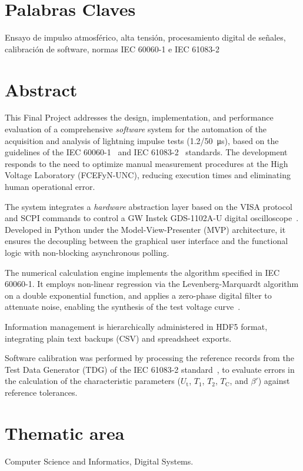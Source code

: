 \section*{Palabras Claves}
Ensayo de impulso atmosférico, alta tensión, procesamiento digital de señales, calibración de software, normas IEC 60060-1 e IEC 61083-2

\newpage
\section*{Abstract}
This Final Project addresses the design, implementation, and performance evaluation of a comprehensive \emph{software} system for the automation of the acquisition and analysis of lightning impulse tests (\qty[parse-numbers=false]{1.2/50}{\micro\second}), based on the guidelines of the IEC 60060-1~\cite{iec60060_1} and IEC 61083-2~\cite{iec61083_2} standards. The development responds to the need to optimize manual measurement procedures at the High Voltage Laboratory (FCEFyN-UNC), reducing execution times and eliminating human operational error.

The system integrates a \emph{hardware} abstraction layer based on the VISA protocol and SCPI commands to control a GW Instek GDS-1102A-U digital oscilloscope~\cite{gds1000au_ProgrammingManual}. Developed in Python under the Model-View-Presenter (MVP) architecture, it ensures the decoupling between the graphical user interface and the functional logic with non-blocking asynchronous polling.

The numerical calculation engine implements the algorithm specified in IEC 60060-1. It employs non-linear regression via the Levenberg-Marquardt algorithm on a double exponential function, and applies a zero-phase digital filter to attenuate noise, enabling the synthesis of the test voltage curve~\cite{iec60060_1}.

Information management is hierarchically administered in HDF5 format, integrating plain text backups (CSV) and spreadsheet exports.

Software calibration was performed by processing the reference records from the Test Data Generator (TDG) of the IEC 61083-2 standard~\cite{iec61083_2}, to evaluate errors in the calculation of the characteristic parameters ($U_\text{t}$, $T_1$, $T_2$, $T_\text{C}$, and $\beta'$) against reference tolerances.

\section*{Thematic area}
Computer Science and Informatics, Digital Systems.

